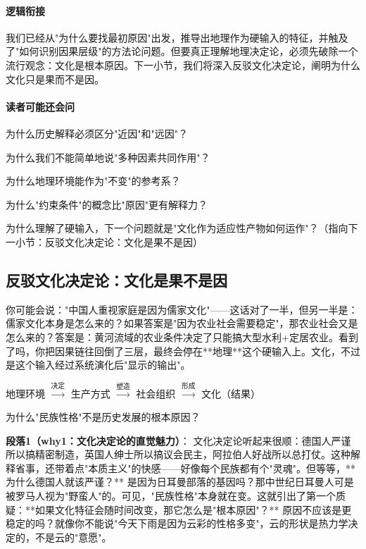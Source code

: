 \documentclass[openany, a4paper, 12pt]{book}
\newenvironment{logicmap}{
	\begin{tcolorbox}[
		colback=blue!5!white,      %
		colframe=blue!50!black,    %
		title=\textbf{逻辑地图 (Logic Map)}, %
		fonttitle=\bfseries,
		sharp corners=south,       %
		boxrule=0.5mm
		]
	\centering
	}{
	\end{tcolorbox}
}
\newenvironment{motivation}{
	\vspace{0.5em}
	\begin{tcolorbox}[
		colback=gray!10,           %
		colframe=gray!60,          %
		title=\textit{本章动机 (Motivation)},
		fonttitle=\bfseries,
		arc=0mm,                   %
		leftrule=3mm               %
		]
		\small \itshape %
	}{
	\end{tcolorbox}
	\vspace{1em}
}
\begin{document}
	\paragraph*{逻辑衔接}
	我们已经从"为什么要找最初原因"出发，推导出地理作为硬输入的特征，并触及了"如何识别因果层级"的方法论问题。但要真正理解地理决定论，必须先破除一个流行观念：文化是根本原因。下一小节，我们将深入反驳文化决定论，阐明为什么文化只是果而不是因。
	
	\paragraph*{读者可能还会问}
	\item 为什么历史解释必须区分"近因"和"远因"？
	\item 为什么我们不能简单地说"多种因素共同作用"？
	\item 为什么地理环境能作为"不变"的参考系？
	\item 为什么"约束条件"的概念比"原因"更有解释力？
	\item 为什么理解了硬输入，下一个问题就是"文化作为适应性产物如何运作"？（指向下一小节：反驳文化决定论：文化是果不是因）
	
	\subsection{反驳文化决定论：文化是果不是因}
	
	\begin{motivation}
		你可能会说："中国人重视家庭是因为儒家文化"——这话对了一半，但另一半是：儒家文化本身是怎么来的？如果答案是"因为农业社会需要稳定"，那农业社会又是怎么来的？答案是：黄河流域的农业条件决定了只能搞大型水利+定居农业。看到了吗，你把因果链往回倒了三层，最终会停在**地理**这个硬输入上。文化，不过是这个输入经过系统演化后"显示的输出"。
	\end{motivation}
	
	\begin{logicmap}
		地理环境 $\xrightarrow{\text{决定}}$ 生产方式 $\xrightarrow{\text{塑造}}$ 社会组织 $\xrightarrow{\text{形成}}$ 文化（结果）
	\end{logicmap}
	
	\begin{questionbox}
		为什么"民族性格"不是历史发展的根本原因？
	\end{questionbox}
	
	\textbf{段落1（why1：文化决定论的直觉魅力）}：  
	文化决定论听起来很顺：德国人严谨所以搞精密制造，英国人绅士所以搞议会民主，阿拉伯人好战所以总打仗。这种解释省事，还带着点"本质主义"的快感——好像每个民族都有个"灵魂"。但等等，**为什么德国人就该严谨？** 是因为日耳曼部落的基因吗？那中世纪日耳曼人可是被罗马人视为"野蛮人"的。可见，"民族性格"本身就在变。这就引出了第一个质疑：**如果文化特征会随时间改变，那它怎么是"根本原因"？** 原因不应该是更稳定的吗？就像你不能说"今天下雨是因为云彩的性格多变"，云的形状是热力学决定的，不是云的"意愿"。
	
\end{document}
